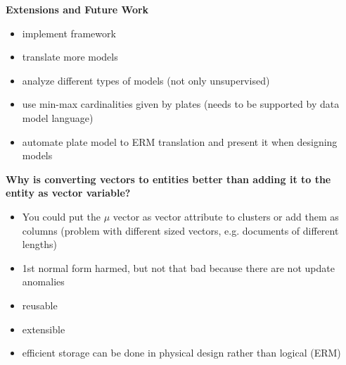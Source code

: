 \textbf{Extensions and Future Work}
\begin{itemize}
\item implement framework
\item translate more models
\item analyze different types of models (not only unsupervised)
\item use min-max cardinalities given by plates (needs to be supported by data model language)
\item automate plate model to ERM translation and present it when designing models
\end{itemize}

\textbf{Why is converting vectors to entities better than adding it to the entity as vector variable?}
\begin{itemize}
\item You could put the $\mu$ vector as vector attribute to clusters or add them as columns (problem with different sized vectors, e.g. documents of different lengths)
\item 1st normal form harmed, but not that bad because there are not update anomalies
\item reusable
\item extensible
\item efficient storage can be done in physical design rather than logical (ERM)
\end{itemize}

